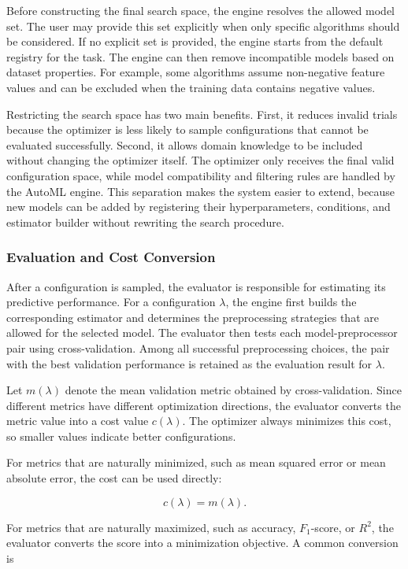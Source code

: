 \documentclass[12pt,a4paper]{report}
\begin{document}
\noindent Before constructing the final search space, the engine resolves the allowed model
set. The user may provide this set explicitly when only specific algorithms
should be considered. If no explicit set is provided, the engine starts from the
default registry for the task. The engine can then remove incompatible models
based on dataset properties. For example, some algorithms assume non-negative
feature values and can be excluded when the training data contains negative
values.

\noindent Restricting the search space has two main benefits. First, it reduces invalid
trials because the optimizer is less likely to sample configurations that cannot
be evaluated successfully. Second, it allows domain knowledge to be included
without changing the optimizer itself. The optimizer only receives the final
valid configuration space, while model compatibility and filtering rules are
handled by the AutoML engine. This separation makes the system easier to extend,
because new models can be added by registering their hyperparameters,
conditions, and estimator builder without rewriting the search procedure.

\subsubsection{Evaluation and Cost Conversion}

After a configuration is sampled, the evaluator is responsible for estimating
its predictive performance. For a configuration \(\lambda\), the engine first
builds the corresponding estimator and determines the preprocessing strategies
that are allowed for the selected model. The evaluator then tests each
model-preprocessor pair using cross-validation. Among all successful
preprocessing choices, the pair with the best validation performance is retained
as the evaluation result for \(\lambda\).

\noindent Let \(m(\lambda)\) denote the mean validation metric obtained by
cross-validation. Since different metrics have different optimization
directions, the evaluator converts the metric value into a cost value
\(c(\lambda)\). The optimizer always minimizes this cost, so smaller values
indicate better configurations.

\noindent For metrics that are naturally minimized, such as mean squared error or mean
absolute error, the cost can be used directly:

\[
c(\lambda) = m(\lambda).
\]

\noindent For metrics that are naturally maximized, such as accuracy, \(F_1\)-score, or
\(R^2\), the evaluator converts the score into a minimization objective. A common
conversion is
\end{document}
